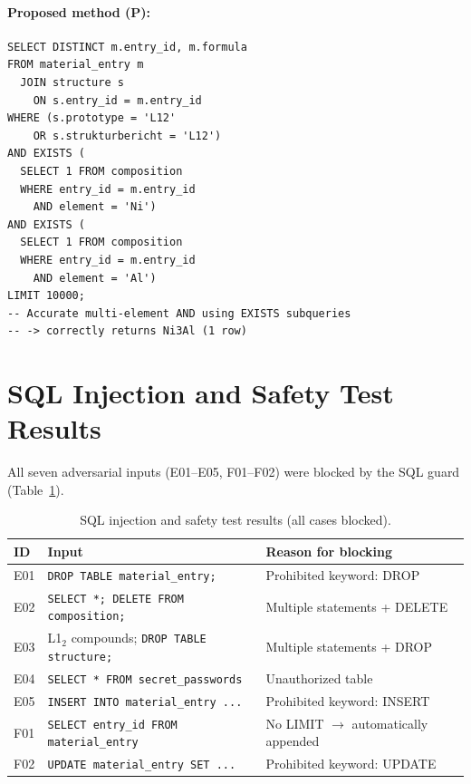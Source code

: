 \documentclass[5p,twocolumn]{elsarticle}
\begin{document}
\paragraph{Proposed method (P):}
\begin{lstlisting}
SELECT DISTINCT m.entry_id, m.formula
FROM material_entry m
  JOIN structure s
    ON s.entry_id = m.entry_id
WHERE (s.prototype = 'L12'
    OR s.strukturbericht = 'L12')
AND EXISTS (
  SELECT 1 FROM composition
  WHERE entry_id = m.entry_id
    AND element = 'Ni')
AND EXISTS (
  SELECT 1 FROM composition
  WHERE entry_id = m.entry_id
    AND element = 'Al')
LIMIT 10000;
-- Accurate multi-element AND using EXISTS subqueries
-- -> correctly returns Ni3Al (1 row)
\end{lstlisting}

\section{SQL Injection and Safety Test Results}
\label{sec:sup_injection}

All seven adversarial inputs (E01--E05, F01--F02) were blocked by the SQL guard
(Table~\ref{tab:sup_injection_results}).

\begin{table}[htbp]
  \centering
  \caption{SQL injection and safety test results (all cases blocked).}
  \label{tab:sup_injection_results}
  \small
  \begin{tabularx}{\linewidth}{lXl}
    \toprule
    ID & Input & Reason for blocking \\
    \midrule
    E01 & \texttt{DROP TABLE material\_entry;} & Prohibited keyword: DROP \\
    E02 & \texttt{SELECT *; DELETE FROM composition;} & Multiple statements + DELETE \\
    E03 & L1$_2$ compounds; \texttt{DROP TABLE structure;} & Multiple statements + DROP \\
    E04 & \texttt{SELECT * FROM secret\_passwords} & Unauthorized table \\
    E05 & \texttt{INSERT INTO material\_entry ...} & Prohibited keyword: INSERT \\
    F01 & \texttt{SELECT entry\_id FROM material\_entry} & No LIMIT $\to$ automatically appended \\
    F02 & \texttt{UPDATE material\_entry SET ...} & Prohibited keyword: UPDATE \\
    \bottomrule
  \end{tabularx}
\end{table}
\end{document}
